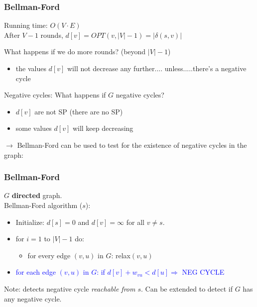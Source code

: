   \begin{frame}[fragile]
  \frametitle{Bellman-Ford}

Running time:   $O(V\cdot E)$\\

After $V-1$ rounds, $d[v] = OPT(v, |V|-1) = |\delta(s,v)|$


What happens if we do more rounds? (beyond $|V|-1$)

\begin{itemize} 
\item the values $d[v]$ will not decrease any further.... unless.....there's a negative cycle
\end{itemize} 

 
Negative cycles:   What happens if $G$ negative cycles? 

\begin{itemize} 
\item $d[v]$ are not SP (there are no SP)
\item some values $d[v]$ will keep decreasing 
\end{itemize}


$\rightarrow$ Bellman-Ford can be used to test for the existence of negative cycles in the graph:
\end{frame} 




  \begin{frame}[fragile]
  \frametitle{Bellman-Ford}
  $G$ {\bf directed} graph. \\

  Bellman-Ford algorithm ($s$): \\
  \begin{itemize} 
  \item Initialize: $d[s]=0$ and $d[v] = \infty$ for all $v \neq
    s$. 
  \item for $i=1$ to $|V|-1$ do: 
    \begin{itemize}
    \item for every edge $(v,u)$ in $G$: relax$(v,u)$
    \end{itemize} 
  \item \textcolor{blue}{for each edge $(v,u)$ in $G$: if $d[v]+ w_{vu} < d[u] \Rightarrow$ NEG CYCLE  }
  \end{itemize} 


Note: detects negative cycle \emph{reachable from $s$}. Can be extended to detect if $G$ has any negative cycle. 
\end{frame} 



